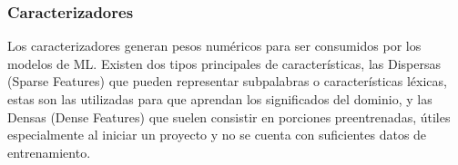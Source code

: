 \subsubsection{Caracterizadores}
Los caracterizadores generan pesos numéricos para ser consumidos por los modelos de ML. Existen dos tipos principales de
características, las Dispersas (Sparse Features) que pueden representar subpalabras o características
léxicas, estas son las utilizadas para que aprendan los significados del dominio, y las Densas (Dense Features) que suelen consistir en porciones preentrenadas, útiles especialmente al iniciar un proyecto y no se cuenta con suficientes datos de entrenamiento.
\begin{table}[h]
    \caption{ Caracterizadores. Elaboración Propia}
    \label{tab:Caracterizadores}
\end{table}

